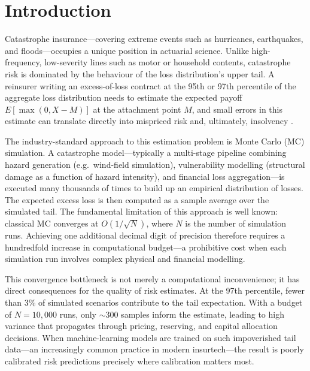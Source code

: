 \documentclass[11pt,a4paper]{article}
\begin{document}

\section{Introduction}
\label{sec:introduction}

Catastrophe insurance---covering extreme events such as hurricanes, earthquakes, and floods---occupies a unique position in actuarial science. Unlike high-frequency, low-severity lines such as motor or household contents, catastrophe risk is dominated by the behaviour of the loss distribution's upper tail. A reinsurer writing an excess-of-loss contract at the 95th or 97th percentile of the aggregate loss distribution needs to estimate the expected payoff $E[\max(0, X - M)]$ at the attachment point $M$, and small errors in this estimate can translate directly into mispriced risk and, ultimately, insolvency \cite{Embrechts1997, Grossi2005}.

The industry-standard approach to this estimation problem is Monte Carlo (MC) simulation. A catastrophe model---typically a multi-stage pipeline combining hazard generation (e.g.\ wind-field simulation), vulnerability modelling (structural damage as a function of hazard intensity), and financial loss aggregation---is executed many thousands of times to build up an empirical distribution of losses. The expected excess loss is then computed as a sample average over the simulated tail. The fundamental limitation of this approach is well known: classical MC converges at $O(1/\sqrt{N})$, where $N$ is the number of simulation runs. Achieving one additional decimal digit of precision therefore requires a hundredfold increase in computational budget---a prohibitive cost when each simulation run involves complex physical and financial modelling.

This convergence bottleneck is not merely a computational inconvenience; it has direct consequences for the quality of risk estimates. At the 97th percentile, fewer than 3\% of simulated scenarios contribute to the tail expectation. With a budget of $N = 10{,}000$ runs, only $\sim$300 samples inform the estimate, leading to high variance that propagates through pricing, reserving, and capital allocation decisions. When machine-learning models are trained on such impoverished tail data---an increasingly common practice in modern insurtech---the result is poorly calibrated risk predictions precisely where calibration matters most.
\end{document}
